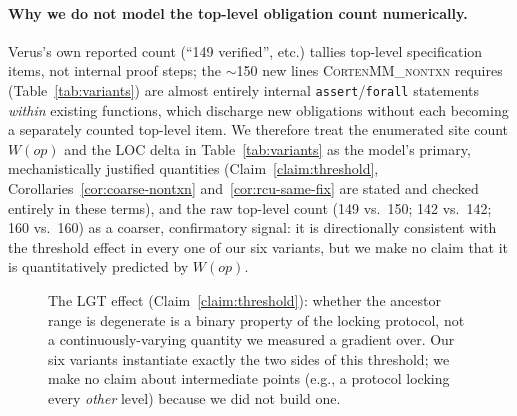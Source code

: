 \documentclass[10pt]{article}
\newcommand{\corten}[1]{\textsc{CortenMM\_#1}}
\newcommand{\vfn}[1]{\texttt{#1}}
\begin{document}
\paragraph{Why we do not model the top-level obligation count
numerically.} Verus's own reported count (``149 verified'', etc.) tallies
top-level specification items, not internal proof steps; the
$\sim$150 new lines \corten{nontxn} requires
(Table~\ref{tab:variants}) are almost entirely internal
\vfn{assert}/\vfn{forall} statements \emph{within} existing functions,
which discharge new obligations without each becoming a separately
counted top-level item. We therefore treat the enumerated site count
$W(\mathit{op})$ and the LOC delta in Table~\ref{tab:variants} as the
model's primary, mechanistically justified quantities
(Claim~\ref{claim:threshold}, Corollaries~\ref{cor:coarse-nontxn}
and~\ref{cor:rcu-same-fix} are stated and checked entirely in these
terms), and the raw top-level count (149 vs.\ 150; 142 vs.\ 142; 160
vs.\ 160) as a coarser, confirmatory signal: it is directionally
consistent with the threshold effect in every one of our six variants,
but we make no claim that it is quantitatively predicted by
$W(\mathit{op})$.

\begin{figure}[h]
\centering
{}
\caption{The LGT effect (Claim~\ref{claim:threshold}): whether the
ancestor range is degenerate is a binary property of the locking
protocol, not a continuously-varying quantity we measured a gradient
over. Our six variants instantiate exactly the two sides of this
threshold; we make no claim about intermediate points (e.g., a
protocol locking every \emph{other} level) because we did not build
one.}
\label{fig:threshold}
\end{figure}
\end{document}
